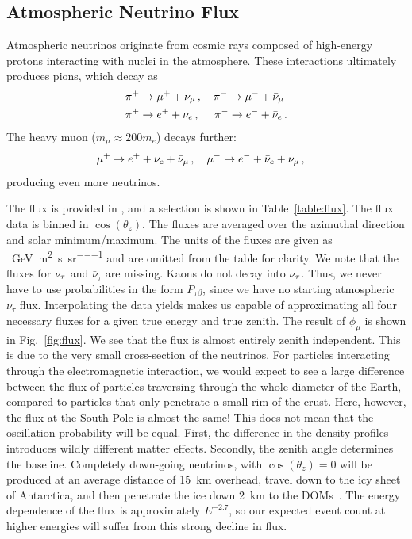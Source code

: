 \subsection{Atmospheric Neutrino Flux}
Atmospheric neutrinos originate from cosmic rays composed of high-energy protons interacting with nuclei in the atmosphere.
These interactions ultimately produces pions, which decay as 
\begin{align}\label{eq:pion}
    &\pi^+ \to \mu^+ + \nu_\mu\,, \quad \pi^- \to \mu^- + \bar{\nu}_\mu \nonumber \\
    &\pi^+ \to e^+ + \nu_e\,,\,\, \quad \pi^- \to e^- + \bar{\nu}_e\,.
\end{align}
The heavy muon ($m_\mu \approx 200m_e$) decays further:
\begin{align}
    &\mu^+ \to e^+ + \nu_e + \bar{\nu}_\mu\,, \quad \mu^- \to e^- + \bar{\nu}_e + \nu_\mu\,,
\end{align}
producing even more neutrinos.

The flux is provided in \cite{hondaData,hondaArticle}, and a selection is shown in Table~\ref{table:flux}.
The flux data is binned in $\cos(\theta_z)$. The fluxes are averaged over the azimuthal direction and solar minimum/maximum. 
The units of the fluxes are given as \si{\per\GeV \per\metre\squared \per\second \per\steradian} and are omitted
from the table for clarity. 
We note that the fluxes for $\nu_\tau$ and $\bar{\nu}_{\tau}$ are missing. Kaons do not decay into $\nu_\tau$. Thus, we never have to use probabilities in the form 
$P_{\tau \beta}$, since we have no starting atmospheric $\nu_\tau$ flux. 
Interpolating the data yields makes us capable of approximating all four necessary fluxes for a given true energy and true zenith.
The result of $\phi_\mu$ is shown in Fig.~\ref{fig:flux}. We see that the flux is almost entirely zenith independent. This is due to the 
very small cross-section of the neutrinos. For particles interacting through the electromagnetic interaction, we would expect to see a 
large difference between the flux of particles traversing through the whole diameter of the Earth, compared to particles that only penetrate a 
small rim of the crust. Here, however, the flux at the South Pole is almost the same! This does not mean that the oscillation probability will be 
equal. First, the difference in the density profiles introduces wildly different matter effects. 
Secondly, the zenith angle determines the baseline. Completely down-going neutrinos, with $\cos(\theta_z) = 0$ will be produced at an average distance of \SI{15}{\km}
overhead, travel down to the icy sheet of Antarctica, and then penetrate the ice down \SI{2}{\km} to the DOMs~\cite{hondapaper}. 
The energy dependence of the flux is approximately $E^{-2.7}$, so our expected event count at higher energies will suffer from this strong decline in flux.

